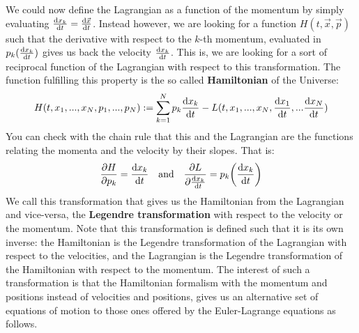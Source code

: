 \documentclass[11pt, a4paper]{article} %
\begin{document}
We could now define the Lagrangian as a function of the momentum by simply evaluating $\dv{x_k}{t}=\dv{\vec{x}}{t} (p_k)$. Instead however, we are looking for a function $H(t, \vec{x}, \vec{p})$ such that the derivative with respect to the $k$-th momentum, evaluated in $p_k(\dv{x_k}{t})$ gives us back the velocity $\dv{x_k}{t}$. This is, we are looking for a sort of reciprocal function of the Lagrangian with respect to this transformation. The function fulfilling this property is the so called {\bf Hamiltonian} of the Universe:
\begin{equation}
H(t, x_1,...,x_N,p_1,...,p_N):=\sum_{k=1}^N p_k \dv{x_k}{t}  (p_k)-L(t, x_1,...,x_N, \dv{x_1}{t} (p_1),... \dv{x_N}{t} (p_N))
\end{equation}
You can check with the chain rule that this and the Lagrangian are the functions relating the momenta and the velocity by their slopes. That is:
\begin{equation}\label{p1}
\pdv{H}{p_k}=\dv{x_k}{t}(p_k)\quad \text{and}\quad \pdv{L}{\dv{x_k}{t}}=p_k\qty(\dv{x_k}{t})
\end{equation}
We call this transformation that gives us the Hamiltonian from the Lagrangian and vice-versa, the {\bf Legendre transformation} with respect to the velocity or the momentum. Note that this transformation is defined such that it is its own inverse: the Hamiltonian is the Legendre transformation of the Lagrangian with respect to the velocities, and the Lagrangian is the Legendre transformation of the Hamiltonian with respect to the momentum. The interest of such a transformation is that the Hamiltonian formalism with the momentum and positions instead of velocities and positions, gives us an alternative set of equations of motion to those ones offered by the Euler-Lagrange equations as follows.
\end{document}
